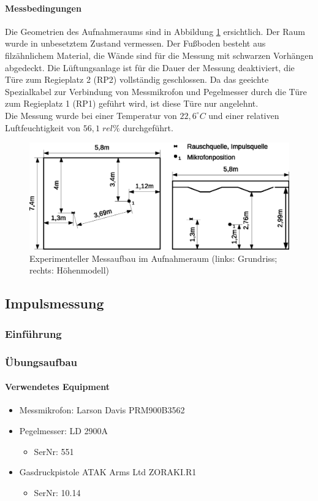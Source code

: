 \documentclass[11pt]{report}
\begin{document}
\paragraph{Messbedingungen}
Die Geometrien des Aufnahmeraums sind in Abbildung \ref{fig:ARgeometrics} ersichtlich. Der Raum wurde in unbesetztem Zustand vermessen. Der Fußboden besteht aus filz\"ahnlichem Material, die W\"ande sind f\"ur die Messung mit schwarzen Vorh\"angen abgedeckt. Die L\"uftungsanlage ist f\"ur die Dauer der Messung deaktiviert, die T\"ure zum Regieplatz 2 (RP2) vollst\"andig geschlossen. Da das geeichte Spezialkabel zur Verbindung von Messmikrofon und Pegelmesser durch die T\"ure zum Regieplatz 1 (RP1) gef\"uhrt wird, ist diese T\"ure nur angelehnt.\\
Die Messung wurde bei einer Temperatur von $22,6^\circ C $ und einer relativen Luftfeuchtigkeit von $56,1\;rel\%$ durchgef\"uhrt.
\begin{figure}[htbp]
\begin{center}
\includegraphics[width=14cm,keepaspectratio=true]{AR}
\caption{Experimenteller Messaufbau im Aufnahmeraum (links: Grundriss; rechts: H\"ohenmodell)}
\label{fig:ARgeometrics}
\end{center}
\end{figure}
\subsection{Impulsmessung}
\subsubsection{Einf\"uhrung}
\label{Impulseinfuehrung}
\subsubsection{Übungsaufbau}
\paragraph{Verwendetes Equipment}
\begin{itemize}
\item Messmikrofon: Larson Davis PRM900B3562
\item Pegelmesser: LD 2900A
\begin{itemize}
\item SerNr: 551
\end{itemize}
\item Gasdruckpistole ATAK Arms Ltd ZORAKI.R1
\begin{itemize}
\item SerNr: 10.14
\end{itemize}
\end{itemize}
\end{document}
